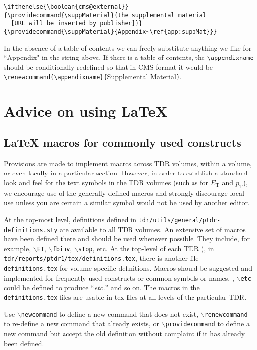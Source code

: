 \begin{verbatim}
\ifthenelse{\boolean{cms@external}}
{\providecommand{\suppMaterial}{the supplemental material
  [URL will be inserted by publisher]}}
{\providecommand{\suppMaterial}{Appendix~\ref{app:suppMat}}}
\end{verbatim}
In the absence of a table of contents we can freely substitute anything we like for ``Appendix"  in the string above. If there is a table of contents, the \verb|\appendixname| should be conditionally redefined so that in CMS format it would be \verb|\renewcommand{\appendixname}{|Supplemental Material\verb|}|.


\clearpage
\section{Advice on using \texorpdfstring{\LaTeX}{LaTeX}\label{latex}}

\subsection{\texorpdfstring{\LaTeX}{LaTeX} macros for commonly used constructs}

Provisions are made to implement macros across TDR volumes, within a
volume, or even locally in a particular section. However, in order to
establish a standard look and feel for the text symbols in the TDR
volumes
(such  as for $E_\text{T}$ and $p_\text{T}$),
we encourage use of the generally
defined macros and strongly discourage local use unless you are
certain a similar symbol would not be used by another editor.

At the top-most level, definitions defined in
{\texttt{tdr/utils/general/ptdr-definitions.sty}} are
available to all TDR volumes. An extensive set of macros have been
defined there and should be used whenever possible. They include, for
example, $\backslash$\texttt{ET}, $\backslash$\texttt{fbinv},
$\backslash$\texttt{sTop}, etc.
At the top-level of each TDR
(\eg, in \texttt{tdr/reports/ptdr1/tex/definitions.tex}, there is another
file \texttt{definitions.tex} for volume-specific definitions. Macros
should be suggested and implemented for
frequently used constructs or common symbols or names, \eg,
{$\backslash$\texttt{etc}}
could be defined to produce ``\emph{etc.}'' and so on.
The macros in the \texttt{definitions.tex} files are usable
in tex files at all levels of the particular TDR.

Use {$\backslash$\texttt{newcommand}} to define a new command that does not exist,
{$\backslash$\texttt{renewcommand}} to re-define a new command that already exists,
or {$\backslash$\texttt{providecommand}} to define a new command but accept the old
definition without complaint if it has already been defined.

